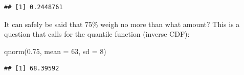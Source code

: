 \documentclass[
]{article}
\newenvironment{Shaded}{\begin{snugshade}}{\end{snugshade}}
\newcommand{\AttributeTok}[1]{\textcolor[rgb]{0.77,0.63,0.00}{#1}}
\newcommand{\DecValTok}[1]{\textcolor[rgb]{0.00,0.00,0.81}{#1}}
\newcommand{\FloatTok}[1]{\textcolor[rgb]{0.00,0.00,0.81}{#1}}
\newcommand{\FunctionTok}[1]{\textcolor[rgb]{0.00,0.00,0.00}{#1}}
\newcommand{\NormalTok}[1]{#1}
\begin{document}
\begin{verbatim}
## [1] 0.2448761
\end{verbatim}

It can safely be said that 75\% weigh no more than what amount? This is
a question that calls for the quantile function (inverse CDF):

\begin{Shaded}
\begin{Highlighting}[]
\FunctionTok{qnorm}\NormalTok{(}\FloatTok{0.75}\NormalTok{, }\AttributeTok{mean =} \DecValTok{63}\NormalTok{, }\AttributeTok{sd =} \DecValTok{8}\NormalTok{)}
\end{Highlighting}
\end{Shaded}

\begin{verbatim}
## [1] 68.39592
\end{verbatim}
\end{document}
